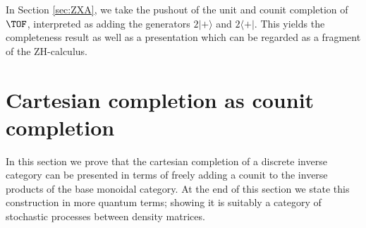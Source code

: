 In Section \ref{sec:ZXA}, we take the pushout of the unit and counit completion of $\TOF$, interpreted as adding the generators $2|+ \rangle$ and $2\langle + |$.  This yields the completeness result as well as a presentation which can be regarded as a fragment of the ZH-calculus.





\section{Cartesian completion as counit completion}
\label{sec:cpm}

In this section we prove that the  cartesian completion of a discrete inverse category can be presented in terms of freely adding a counit to the inverse products of the base monoidal category.  At the end of this section we state this construction in more quantum terms; showing it is suitably a category of stochastic processes between density matrices.

